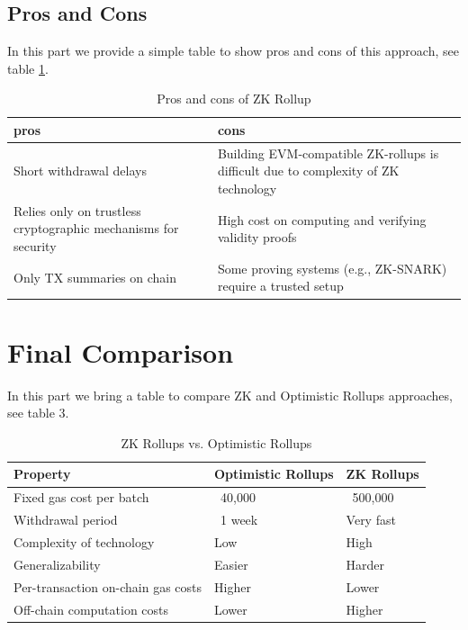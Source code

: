 \documentclass{report}
\begin{document}
\subsection{Pros and Cons}
In this part we provide a simple table to show pros and cons of this approach, see table \ref{table:t2}.
\begin{table}[htbp]
	\centering
	\captionsetup{justification=centering}
	\caption[position=above]{Pros and cons of ZK Rollup}
	\begin{tabular}{|>{\centering\arraybackslash}p{4cm}|>{\centering\arraybackslash}p{4cm}|}
		\hline
		\textbf{pros} & \textbf{cons}\\
		\hline
		Short withdrawal delays	& Building EVM-compatible ZK-rollups is difficult due to complexity of ZK technology \\
		\hline
		Relies only on trustless cryptographic mechanisms for security & High cost on computing and verifying validity proofs \\
		\hline
		Only TX summaries on chain & Some proving systems (e.g., ZK-SNARK) require a trusted setup \\
		\hline
	\end{tabular}
	\label{table:t2}
\end{table}
\section{Final Comparison}
In this part we bring a table to compare ZK and Optimistic Rollups approaches, see table 3.
\begin{table}[htbp]
	\centering
	\captionsetup{justification=centering}
	\caption[position=above]{ZK Rollups vs. Optimistic Rollups}
	\begin{tabular}{|>{\centering\arraybackslash}p{4cm}|>{\centering\arraybackslash}p{4cm}|>{\centering\arraybackslash}p{4cm}|}
		\hline
		\textbf{Property} & \textbf{Optimistic Rollups} & \textbf{ZK Rollups}\\
		\hline
		Fixed gas cost per batch & ~40,000 & ~500,000\\
		\hline
		Withdrawal period & ~1 week & Very fast \\
		\hline
		Complexity of technology & Low & High \\
		\hline
		Generalizability & Easier & Harder \\
		\hline
		Per-transaction on-chain gas costs & Higher & Lower \\
		\hline
		Off-chain computation costs & Lower & Higher \\
		\hline
	\end{tabular}
	\label{table:t3}
\end{table}
\end{document}
